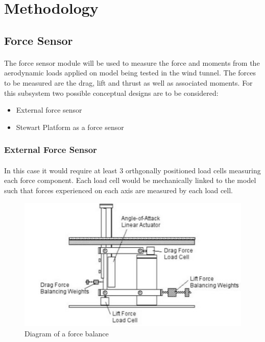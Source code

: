 \section{Methodology}
\subsection{Force Sensor}
\paragraph{}The force sensor module will be used to measure the force and moments from the aerodynamic loads applied on model being tested in the wind tunnel. The forces to be measured are the drag, lift and thrust as well as associated moments. For this subsystem two possible conceptual designs are to be considered:
\begin{itemize}
\item External force sensor
\item Stewart Platform as a force sensor
\end{itemize}
\subsubsection{External Force Sensor}
\paragraph{}In this case it would require at least 3 orthgonally positioned load cells measuring each force component. Each load cell would be mechanically linked to the model such that forces experienced on each axis are measured by each load cell. 
\begin{center}
	\begin{figure}[!h]
		\centering
		\includegraphics{Figures/modBal}
		\caption{Diagram of a force balance \cite{post_force_2010}}
	\end{figure}
\end{center}

